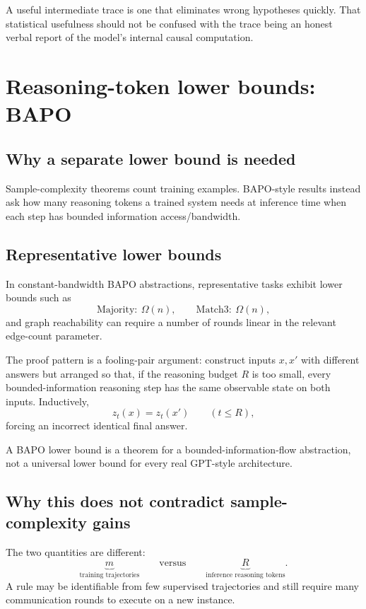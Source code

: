 \documentclass[11pt,a4paper,oneside,openany]{memoir}
\theoremstyle{definition}
\begin{document}
\begin{presentbox}
A useful intermediate trace is one that eliminates wrong hypotheses quickly.  That statistical usefulness should not be confused with the trace being an honest verbal report of the model's internal causal computation.
\end{presentbox}

\chapter{Reasoning-token lower bounds: BAPO}
\section{Why a separate lower bound is needed}
Sample-complexity theorems count training examples.  BAPO-style results instead ask how many reasoning tokens a trained system needs at inference time when each step has bounded information access/bandwidth.

\section{Representative lower bounds}
In constant-bandwidth BAPO abstractions, representative tasks exhibit lower bounds such as
\[
\mathrm{Majority}:\ \Omega(n),
\qquad
\mathrm{Match3}:\ \Omega(n),
\]
and graph reachability can require a number of rounds linear in the relevant edge-count parameter.

The proof pattern is a fooling-pair argument: construct inputs $x,x'$ with different answers but arranged so that, if the reasoning budget $R$ is too small, every bounded-information reasoning step has the same observable state on both inputs.  Inductively,
\[
z_t(x)=z_t(x')\qquad(t\le R),
\]
forcing an incorrect identical final answer.

\begin{warningbox}
A BAPO lower bound is a theorem for a bounded-information-flow abstraction, not a universal lower bound for every real GPT-style architecture.
\end{warningbox}

\section{Why this does not contradict sample-complexity gains}
The two quantities are different:
\[
\underbrace{m}_{\text{training trajectories}}
\qquad\text{versus}\qquad
\underbrace{R}_{\text{inference reasoning tokens}}.
\]
A rule may be identifiable from few supervised trajectories and still require many communication rounds to execute on a new instance.
\end{document}
